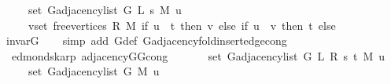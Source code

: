 \begin{isabellebody}
\ \ \ \ \ set\ {\isacharparenleft}{\kern0pt}G{\isachardot}{\kern0pt}adjacency{\isacharunderscore}{\kern0pt}list\ {\isacharparenleft}{\kern0pt}G{}{\isacharunderscore}{\kern0pt}{}\ L\ s\ M{\isacharparenright}{\kern0pt}\ u{\isacharparenright}{\kern0pt}\ {\isasymunion}\isanewline
\ \ \ \ \ {\isacharparenleft}{\kern0pt}{\isasymUnion}v{\isasymin}set\ {\isacharparenleft}{\kern0pt}free{\isacharunderscore}{\kern0pt}vertices\ R\ M{\isacharparenright}{\kern0pt}{\isachardot}{\kern0pt}\ if\ u\ {\isacharequal}{\kern0pt}\ t\ then\ {\isacharbraceleft}{\kern0pt}v{\isacharbraceright}{\kern0pt}\ else\ if\ u\ {\isacharequal}{\kern0pt}\ v\ then\ {\isacharbraceleft}{\kern0pt}t{\isacharbraceright}{\kern0pt}\ else\ {\isacharbraceleft}{\kern0pt}{\isacharbraceright}{\kern0pt}{\isacharparenright}{\kern0pt}{\isachardoublequoteclose}%
\endisataginvisible
{\isafoldinvisible}%
%
\isadeliminvisible
\isanewline
%
\endisadeliminvisible
%
\isadelimproof
\ \ %
\endisadelimproof
%
\isatagproof
{}\isamarkupfalse%
\ invar{\isacharunderscore}{\kern0pt}G{}{\isacharunderscore}{\kern0pt}{}\isanewline
\ \ \isamarkupfalse%
\ {\isacharparenleft}{\kern0pt}simp\ add{\isacharcolon}{\kern0pt}\ G{}{\isacharunderscore}{\kern0pt}{}{\isacharunderscore}{\kern0pt}def\ G{\isachardot}{\kern0pt}adjacency{\isacharunderscore}{\kern0pt}fold{\isacharunderscore}{\kern0pt}insert{\isacharunderscore}{\kern0pt}edge{\isacharunderscore}{\kern0pt}cong{\isacharparenright}{\kern0pt}%
\endisatagproof
{\isafoldproof}%
%
\isadelimproof
\isanewline
%
\endisadelimproof
%
\isadeliminvisible
\isanewline
%
\endisadeliminvisible
%
\isataginvisible
{}\isamarkupfalse%
\ {\isacharparenleft}{\kern0pt}\ edmonds{\isacharunderscore}{\kern0pt}karp{\isacharparenright}{\kern0pt}\ adjacency{\isacharunderscore}{\kern0pt}G{}{\isacharunderscore}{\kern0pt}{}{\isacharunderscore}{\kern0pt}G{}{\isacharunderscore}{\kern0pt}{}{\isacharunderscore}{\kern0pt}cong{\isacharcolon}{\kern0pt}\isanewline
\ \ \isanewline
\ \ \ \ {\isachardoublequoteopen}set\ {\isacharparenleft}{\kern0pt}G{\isachardot}{\kern0pt}adjacency{\isacharunderscore}{\kern0pt}list\ {\isacharparenleft}{\kern0pt}G{}{\isacharunderscore}{\kern0pt}{}\ L\ R\ s\ t\ M{\isacharparenright}{\kern0pt}\ u{\isacharparenright}{\kern0pt}\ {\isacharequal}{\kern0pt}\isanewline
\ \ \ \ \ set\ {\isacharparenleft}{\kern0pt}G{\isachardot}{\kern0pt}adjacency{\isacharunderscore}{\kern0pt}list\ {\isacharparenleft}{\kern0pt}G{}{\isacharunderscore}{\kern0pt}{}\ M{\isacharparenright}{\kern0pt}\ u{\isacharparenright}{\kern0pt}\ {\isasymunion}\isanewline

\end{isabellebody}
